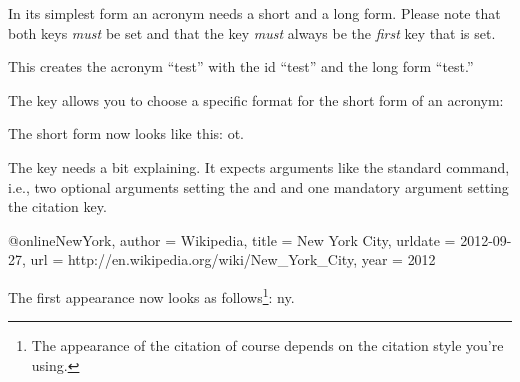 \documentclass[DIV10,toc=index,toc=bib,hyperfootnotes=false]{cnpkgdoc}
\begin{document}
In its simplest form an acronym needs a short and a long form. Please note that
both keys \emph{must} be set and that the  key \emph{must} always be
the \emph{first} key that is set.
\begin{beispiel}
\end{beispiel}
This creates the acronym ``\acs{test}'' with the \acs{id} ``test'' and the long
form ``\acl{test}.''

The  key allows you to choose a specific format for the short form of
an acronym:
\begin{beispiel}
\end{beispiel}
The short form now looks like this: \acs{ot}.

The  key needs a bit explaining. It expects arguments like the standard
 command, i.e., two optional arguments setting the 
and  and one mandatory argument setting the citation key.
\begin{beispiel}
 @online{NewYork,
   author  = {Wikipedia},
   title   = {New York City},
   urldate = {2012-09-27},
   url     = {http://en.wikipedia.org/wiki/New_York_City},
   year    = {2012}
 }
\end{beispiel}
The first appearance now looks as follows\footnote{The appearance of the citation
of course depends on the citation style you're using.}: \acf{ny}.
\end{document}
